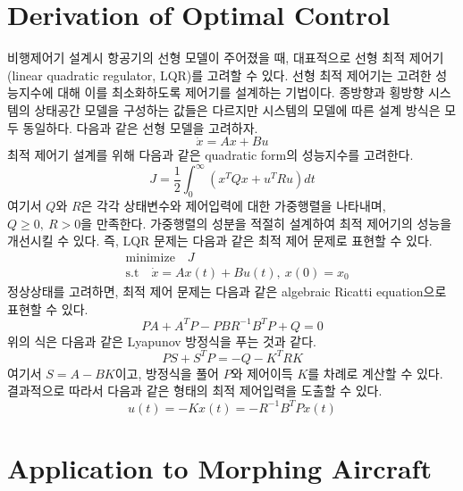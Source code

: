 \documentclass[a4paper, 12pt]{report}
\begin{document}
	\section{Derivation of Optimal Control}
	
	비행제어기 설계시 항공기의 선형 모델이 주어졌을 때, 대표적으로 선형 최적 제어기(linear quadratic regulator, LQR)를 고려할 수 있다.
	선형 최적 제어기는 고려한 성능지수에 대해 이를 최소화하도록 제어기를 설계하는 기법이다. 
	종방향과 횡방향 시스템의 상태공간 모델을 구성하는 값들은 다르지만 시스템의 모델에 따른 설계 방식은 모두 동일하다. 
	다음과 같은 선형 모델을 고려하자.
	\begin{equation}
		\dot{x}=Ax+Bu
	\end{equation}
	최적 제어기 설계를 위해 다음과 같은 quadratic form의 성능지수를 고려한다.
	\begin{equation}
		J=\frac{1}{2}\int_0^{\infty}(x^TQx+u^TRu)dt
	\end{equation}
	여기서 $Q$와 $R$은 각각 상태변수와 제어입력에 대한 가중행렬을 나타내며, $Q\geq0,\ R>0$을 만족한다. 
	가중행렬의 성분을 적절히 설계하여 최적 제어기의 성능을 개선시킬 수 있다.
	즉, LQR 문제는 다음과 같은 최적 제어 문제로 표현할 수 있다.
	\begin{equation}
		\begin{aligned}
			&\mathrm{minimize} \hspace{1em} J\\
			&\mathrm{s.t} \hspace{1em} \dot{x}=Ax(t)+Bu(t),\ x(0)=x_0
		\end{aligned}
	\end{equation}
	정상상태를 고려하면, 최적 제어 문제는 다음과 같은 algebraic Ricatti equation으로 표현할 수 있다.
	\begin{equation}
		PA+A^TP-PBR^{-1}B^TP+Q=0
	\end{equation}
	위의 식은 다음과 같은 Lyapunov 방정식을 푸는 것과 같다.
	\begin{equation}
		PS+S^TP=-Q-K^TRK
	\end{equation}
	여기서 $S=A-BK$이고, 방정식을 풀어 $P$와 제어이득 $K$를 차례로 계산할 수 있다.
	결과적으로 따라서 다음과 같은 형태의 최적 제어입력을 도출할 수 있다.
	\begin{equation}
		u(t)=-Kx(t)=-R^{-1}B^TPx(t)
	\end{equation}
	
	\section{Application to Morphing Aircraft}
	
\end{document}

